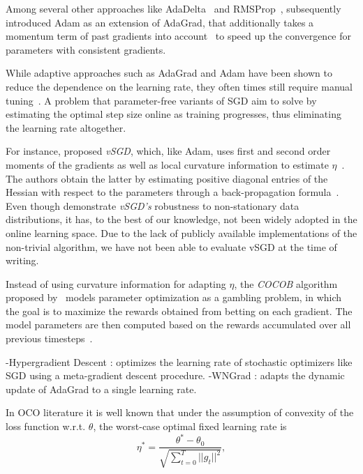 \documentclass[letterpaper]{article} %
\begin{document}
Among several other approaches like AdaDelta~\cite[see e.g.]{zeilerADADELTAAdaptiveLearning2012a} and RMSProp~\cite{tielemanLecture5rmspropDivide2012}, \citet{kingmaAdamMethodStochastic2017b} subsequently introduced Adam as an extension of AdaGrad, that additionally takes a momentum term of past gradients into account~\cite[see]{sutskeverImportanceInitializationMomentum2013} to speed up the convergence for parameters with consistent gradients.

While adaptive approaches such as AdaGrad and Adam have been shown to reduce the dependence on the learning rate, they often times still require manual tuning~\cite{wuWNGradLearnLearning2020}.
A problem that parameter-free variants of SGD aim to solve by estimating the optimal step size online as training progresses, thus eliminating the learning rate altogether.

For instance, \citet{schaulNoMorePesky2013} proposed \textit{vSGD}, which, like Adam, uses first and second order moments of the gradients as well as local curvature information to estimate $\eta$~\cite{schaulNoMorePesky2013}.
The authors obtain the latter by estimating positive diagonal entries of the Hessian with respect to the parameters through a back-propagation formula~\cite{schaulNoMorePesky2013}.
Even though \citet{schaulNoMorePesky2013} demonstrate \textit{vSGD's} robustness to non-stationary data distributions, it has, to the best of our knowledge, not been widely adopted in the online learning space.
Due to the lack of publicly available implementations of the non-trivial algorithm, we have not been able to evaluate vSGD at the time of writing. 

Instead of using curvature information for adapting $\eta$, the \textit{COCOB} algorithm proposed by~\citet{orabonaTrainingDeepNetworks2017} models parameter optimization as a gambling problem, in which the goal is to maximize the rewards obtained from betting on each gradient.
The model parameters are then computed based on the rewards accumulated over all previous timesteps~\cite{orabonaTrainingDeepNetworks2017}.


-Hypergradient Descent \cite{baydinOnlineLearningRate2018}: optimizes the learning rate of stochastic optimizers like SGD using a meta-gradient descent procedure.
-WNGrad \cite{wuWNGradLearnLearning2020}: adapts the dynamic update of AdaGrad to a single learning rate.


In OCO literature it is well known that under the assumption of convexity of the loss function w.r.t. $\theta$, the worst-case optimal fixed learning rate is
\begin{equation}
	\eta^* = \frac{\theta^* - \theta_0}{\sqrt{\sum_{t=0}^{T} ||g_t||^2}},
\end{equation}
\end{document}
